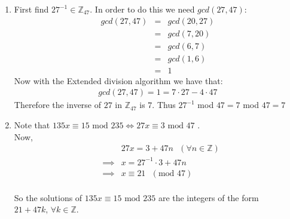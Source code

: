 \begin{enumerate}

\item First find $27^{-1} \in \mathbb{Z}_{47}$. In order to do this we need $gcd(27,47)$:
\begin{eqnarray*}
    gcd(27,47) &=& gcd(20,27) \\
    &=& gcd(7,20) \\
    &=& gcd(6,7) \\
    &=& gcd(1,6) \\
    &=& 1
\end{eqnarray*}
Now with the Extended division algorithm we have that:
\begin{eqnarray*}
    gcd(27,47) = 1 = 7 \cdot 27 - 4 \cdot 47
\end{eqnarray*}
Therefore the inverse of $27$ in $\mathbb{Z}_{47}$ is $7$.
Thus $27^{-1}$ mod $47 = 7$ mod $47 = 7$

\item Note that $135x \equiv 15 \textrm{ mod } 235 \iff 27x \equiv 3
\textrm{ mod } 47$ \cite{slides_30}.\\

Now, \begin{eqnarray*}
	&& 27x = 3 + 47n \textrm{ } (\forall n \in \mathbb{Z}) \\
	&\implies& x = 27^{-1} \cdot 3 + 47n \\
	&\implies& x \equiv 21 \textrm{ } (\textrm{mod } 47) \\
\end{eqnarray*}

So the solutions of $135x \equiv 15 \textrm{ mod } 235$ are the integers of the
form $21 + 47k \textrm{, } \forall k \in \mathbb{Z}$.

\end{enumerate}
